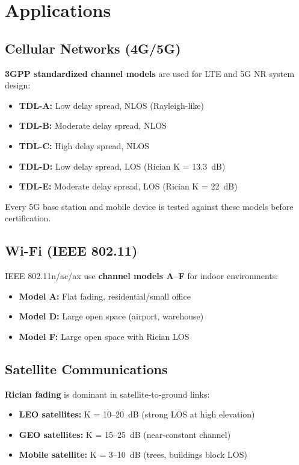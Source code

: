 \section{Applications}

\subsection{Cellular Networks (4G/5G)}

\textbf{3GPP standardized channel models} are used for LTE and 5G NR system design:
\begin{itemize}
\item \textbf{TDL-A:} Low delay spread, NLOS (Rayleigh-like)
\item \textbf{TDL-B:} Moderate delay spread, NLOS
\item \textbf{TDL-C:} High delay spread, NLOS
\item \textbf{TDL-D:} Low delay spread, LOS (Rician K = 13.3~dB)
\item \textbf{TDL-E:} Moderate delay spread, LOS (Rician K = 22~dB)
\end{itemize}

Every 5G base station and mobile device is tested against these models before certification.

\subsection{Wi-Fi (IEEE 802.11)}

IEEE 802.11n/ac/ax use \textbf{channel models A--F} for indoor environments:
\begin{itemize}
\item \textbf{Model A:} Flat fading, residential/small office
\item \textbf{Model D:} Large open space (airport, warehouse)
\item \textbf{Model F:} Large open space with Rician LOS
\end{itemize}

\subsection{Satellite Communications}

\textbf{Rician fading} is dominant in satellite-to-ground links:
\begin{itemize}
\item \textbf{LEO satellites:} K = 10--20~dB (strong LOS at high elevation)
\item \textbf{GEO satellites:} K = 15--25~dB (near-constant channel)
\item \textbf{Mobile satellite:} K = 3--10~dB (trees, buildings block LOS)
\end{itemize}


